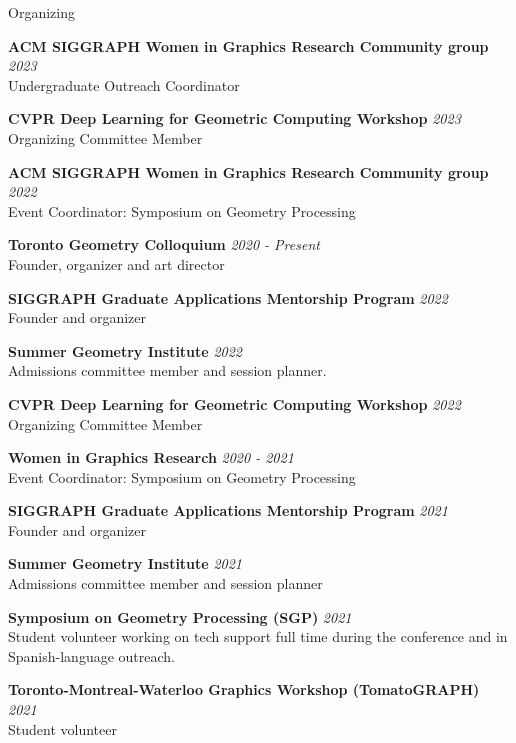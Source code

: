 \documentclass{resume}
\newcommand{\cvitem}[3]{
    {\bf #1} \hfill {\em \small #2} \\ 
    {\small#3 }
}
\begin{document}
\begin{rSection}{Organizing}

\cvitem{ACM SIGGRAPH Women in Graphics Research Community group}{2023}{Undergraduate Outreach Coordinator}

\cvitem{CVPR Deep Learning for Geometric Computing Workshop}{2023} 
{Organizing Committee Member}

\cvitem{ACM SIGGRAPH Women in Graphics Research Community group}{2022}{Event Coordinator: Symposium on Geometry Processing}
    
\cvitem{Toronto Geometry Colloquium}{2020 - Present}{Founder, organizer and art director}

\cvitem{SIGGRAPH Graduate Applications Mentorship Program}{2022} 
{Founder and organizer}

\cvitem{Summer Geometry Institute}{2022} 
{Admissions committee member and session planner.}

\cvitem{CVPR Deep Learning for Geometric Computing Workshop}{2022} 
{Organizing Committee Member}

\cvitem{Women in Graphics Research}{2020 - 2021}{Event Coordinator: Symposium on Geometry Processing}

\cvitem{SIGGRAPH Graduate Applications Mentorship Program}{2021} 
{Founder and organizer}

\cvitem{Summer Geometry Institute}{2021} 
{Admissions committee member and session planner}

\cvitem{Symposium on Geometry Processing (SGP)}{2021} 
{Student volunteer working on tech support full time during the conference and in Spanish-language outreach.}

\cvitem{Toronto-Montreal-Waterloo Graphics Workshop (TomatoGRAPH)}{2021} 
{Student volunteer}





\end{rSection}
\end{document}
